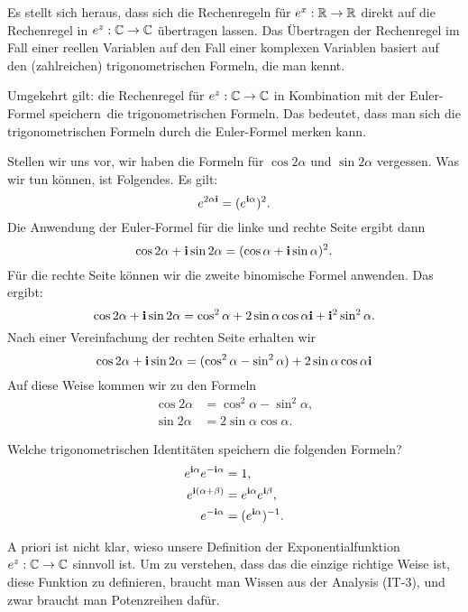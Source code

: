 \begin{bem}
	Es stellt sich heraus, dass sich die Rechenregeln für $e^x : \mathbb{R}\to \mathbb{R}$ direkt auf die Rechenregel in $e^z : \mathbb{C} \to \mathbb{C}$ übertragen lassen. Das Übertragen der Rechenregel im Fall einer reellen Variablen auf den Fall einer komplexen Variablen basiert auf den (zahlreichen) trigonometrischen Formeln, die man kennt. 
	
	Umgekehrt gilt: die Rechenregel für $e^z : \mathbb{C} \to \mathbb{C}$ in Kombination mit der Euler-Formel \glqq speichern\grqq\ die trigonometrischen Formeln. Das bedeutet, dass man sich die trigonometrischen Formeln durch die Euler-Formel merken kann. 
	
	Stellen wir uns vor, wir haben die Formeln für $\cos 2 \alpha$ und $\sin 2 \alpha$ vergessen. Was wir tun können, ist Folgendes. Es gilt: 
	\[
			e^{2 \alpha \mathbf{i}} = (e^{\mathbf{i} \alpha} )^2. 
	\]
	Die Anwendung der Euler-Formel für die linke und rechte Seite ergibt dann 
	\[
		\cos 2 \alpha + \mathbf{i} \sin 2 \alpha  = (\cos \alpha + \mathbf{i} \sin \alpha)^2. 
	\]
	Für die rechte Seite können wir die zweite binomische Formel anwenden. Das ergibt: 
	\[
		\cos 2 \alpha + \mathbf{i} \sin 2 \alpha  = \cos^2 \alpha + 2\sin \alpha \cos \alpha  \mathbf{i} + \mathbf{i}^2 \sin^2 \alpha. 
	\]
	Nach einer Vereinfachung der rechten Seite erhalten wir 
	\[
	\cos 2 \alpha + \mathbf{i} \sin 2 \alpha  = (\cos^2 \alpha - \sin^2 \alpha ) + 2\sin \alpha \cos \alpha \mathbf{i}
\]
Auf diese Weise kommen wir zu den Formeln
\begin{align*}
		\cos 2 \alpha  & = \cos^2 \alpha - \sin^2 \alpha, 
		\\ \sin 2 \alpha & = 2 \sin \alpha \cos \alpha. 
\end{align*} 
\end{bem} 

\begin{aufg} 
	Welche trigonometrischen Identitäten speichern die folgenden Formeln? 
	\begin{align*}
			e^{\mathbf{i} \alpha} e^{- \mathbf{i} \alpha} & =1, 
			\\ e^{\mathbf{i} (\alpha + \beta)} & = e^{\mathbf{i} \alpha} e^{\mathbf{i} \beta},
			\\ e^{- \mathbf{i} \alpha} & = (e^{\mathbf{i} \alpha})^{-1}. 
	\end{align*} 
\end{aufg} 

\begin{bem}
	A priori ist nicht klar, wieso unsere Definition der Exponentialfunktion $e^z : \mathbb{C} \to \mathbb{C}$ sinnvoll ist. Um zu verstehen, dass das die einzige richtige Weise ist, diese Funktion zu definieren, braucht man Wissen aus der Analysis (IT-3), und zwar braucht  man Potenzreihen dafür. 
\end{bem} 

